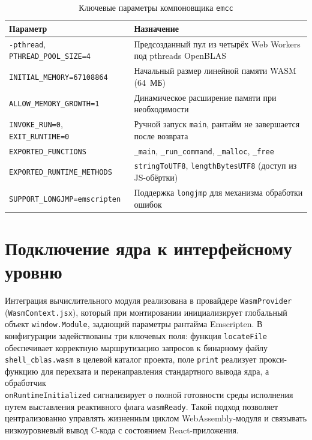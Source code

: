 \documentclass[12pt, oneside]{book}
\begin{document}
\begin{table}[htbp]
\centering
\scriptsize
\renewcommand{\arraystretch}{1.15}
\begin{tabular}{|p{5.6cm}|p{7.4cm}|}
\hline
\rowcolor{thbg} \textbf{Параметр} & \textbf{Назначение} \\
\hline
\texttt{-pthread}, \texttt{PTHREAD\_POOL\_SIZE=4} & Предсозданный пул из четырёх Web Workers под pthreads OpenBLAS \\
\hline
\texttt{INITIAL\_MEMORY=67108864} & Начальный размер линейной памяти WASM (64~МБ) \\
\hline
\texttt{ALLOW\_MEMORY\_GROWTH=1} & Динамическое расширение памяти при необходимости \\
\hline
\texttt{INVOKE\_RUN=0}, \texttt{EXIT\_RUNTIME=0} & Ручной запуск \texttt{main}, рантайм не завершается после возврата \\
\hline
\texttt{EXPORTED\_FUNCTIONS} & \texttt{\_main}, \texttt{\_run\_command}, \texttt{\_malloc}, \texttt{\_free} \\
\hline
\texttt{EXPORTED\_RUNTIME\_METHODS} & \texttt{stringToUTF8}, \texttt{lengthBytesUTF8} (доступ из JS-обёртки) \\
\hline
\texttt{SUPPORT\_LONGJMP=emscripten} & Поддержка \texttt{longjmp} для механизма обработки ошибок \\
\hline
\end{tabular}
\caption{Ключевые параметры компоновщика \texttt{emcc}}
\label{tab:emcc_flags}
\end{table}
\section{Подключение ядра к интерфейсному уровню}

     \quad Интеграция вычислительного модуля реализована в провайдере \texttt{WasmProvider} (\texttt{WasmContext.jsx}), который при монтировании инициализирует глобальный объект \texttt{window.Module}, задающий параметры рантайма Emscripten. В конфигурации задействованы три ключевых поля: функция \texttt{locateFile} обеспечивает корректную маршрутизацию запросов к бинарному файлу \texttt{shell\_cblas.wasm} в целевой каталог проекта, поле \texttt{print} реализует прокси-функцию для перехвата и перенаправления стандартного вывода ядра, а обработчик\\ \texttt{onRuntimeInitialized} сигнализирует о полной готовности среды исполнения путем выставления реактивного флага \texttt{wasmReady}. Такой подход позволяет централизованно управлять жизненным циклом WebAssembly-модуля и связывать низкоуровневый вывод C-кода с состоянием React-приложения.
\end{document}
